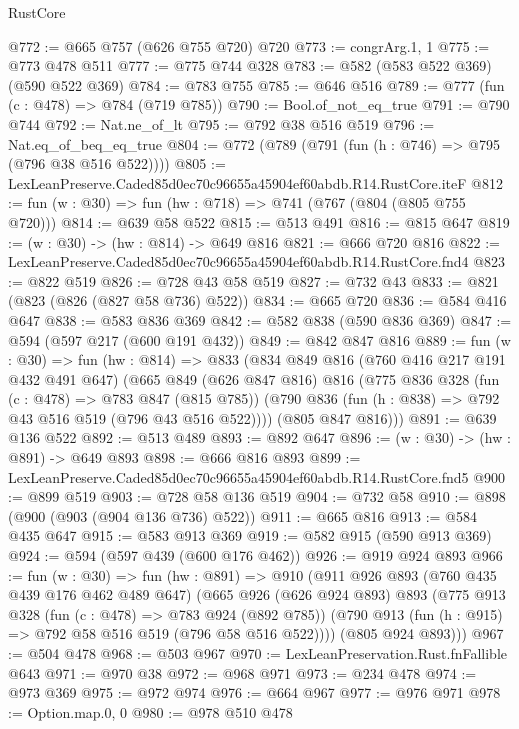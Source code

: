 \begin{lexlean}{RustCore}
\begin{coremodule}
@772 := @665 @757 (@626 @755 @720) @720
@773 := congrArg.{1, 1}
@775 := @773 @478 @511
@777 := @775 @744 @328
@783 := @582 (@583 @522 @369) (@590 @522 @369)
@784 := @783 @755
@785 := @646 @516
@789 := @777 (fun (c : @478) => @784 (@719 @785))
@790 := Bool.of_not_eq_true
@791 := @790 @744
@792 := Nat.ne_of_lt
@795 := @792 @38 @516 @519
@796 := Nat.eq_of_beq_eq_true
@804 := @772 (@789 (@791 (fun (h : @746) => @795 (@796 @38 @516 @522))))
@805 := LexLeanPreserve.Caded85d0ec70c96655a45904ef60abdb.R14.RustCore.iteF
@812 := fun (w : @30) => fun (hw : @718) => @741 (@767 (@804 (@805 @755 @720)))
@814 := @639 @58 @522
@815 := @513 @491
@816 := @815 @647
@819 := (w : @30) -> (hw : @814) -> @649 @816
@821 := @666 @720 @816
@822 := LexLeanPreserve.Caded85d0ec70c96655a45904ef60abdb.R14.RustCore.fnd4
@823 := @822 @519
@826 := @728 @43 @58 @519
@827 := @732 @43
@833 := @821 (@823 (@826 (@827 @58 @736) @522))
@834 := @665 @720
@836 := @584 @416 @647
@838 := @583 @836 @369
@842 := @582 @838 (@590 @836 @369)
@847 := @594 (@597 @217 (@600 @191 @432))
@849 := @842 @847 @816
@889 := fun (w : @30) =>
  fun (hw : @814) =>
  @833
    (@834
      @849
      @816
      (@760 @416 @217 @191 @432 @491 @647)
      (@665
        @849
        (@626 @847 @816)
        @816
        (@775
          @836
          @328
          (fun (c : @478) => @783 @847 (@815 @785))
          (@790 @836 (fun (h : @838) => @792 @43 @516 @519 (@796 @43 @516 @522))))
        (@805 @847 @816)))
@891 := @639 @136 @522
@892 := @513 @489
@893 := @892 @647
@896 := (w : @30) -> (hw : @891) -> @649 @893
@898 := @666 @816 @893
@899 := LexLeanPreserve.Caded85d0ec70c96655a45904ef60abdb.R14.RustCore.fnd5
@900 := @899 @519
@903 := @728 @58 @136 @519
@904 := @732 @58
@910 := @898 (@900 (@903 (@904 @136 @736) @522))
@911 := @665 @816
@913 := @584 @435 @647
@915 := @583 @913 @369
@919 := @582 @915 (@590 @913 @369)
@924 := @594 (@597 @439 (@600 @176 @462))
@926 := @919 @924 @893
@966 := fun (w : @30) =>
  fun (hw : @891) =>
  @910
    (@911
      @926
      @893
      (@760 @435 @439 @176 @462 @489 @647)
      (@665
        @926
        (@626 @924 @893)
        @893
        (@775
          @913
          @328
          (fun (c : @478) => @783 @924 (@892 @785))
          (@790 @913 (fun (h : @915) => @792 @58 @516 @519 (@796 @58 @516 @522))))
        (@805 @924 @893)))
@967 := @504 @478
@968 := @503 @967
@970 := LexLeanPreservation.Rust.fnFallible @643
@971 := @970 @38
@972 := @968 @971
@973 := @234 @478
@974 := @973 @369
@975 := @972 @974
@976 := @664 @967
@977 := @976 @971
@978 := Option.map.{0, 0}
@980 := @978 @510 @478

\end{coremodule}
\end{lexlean}
